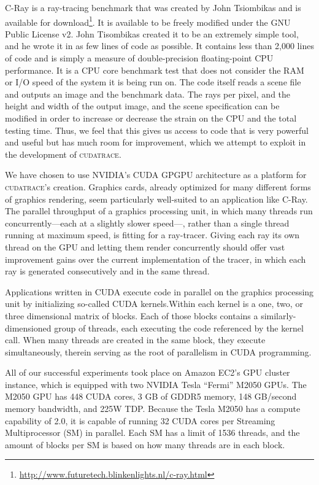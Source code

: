 \documentclass[12pt]{article}
\begin{document}
C-Ray is a ray-tracing benchmark that was created by John Tsiombikas and is available for download\footnote{\url{http://www.futuretech.blinkenlights.nl/c-ray.html}}. It is available to be freely modified under the GNU Public License v2. John Tisombikas created it to be an extremely simple tool, and he wrote it in as few lines of code as possible. It contains less than 2,000 lines of code and is simply a measure of double-precision floating-point CPU performance. It is a CPU core benchmark test that does not consider the RAM or I/O speed of the system it is being run on. The code itself reads a scene file and outputs an image and the benchmark data. The rays per pixel, and the height and width of the output image, and the scene specification can be modified in order to increase or decrease the strain on the CPU and the total testing time. Thus, we feel that this gives us access to code that is very powerful and useful but has much room for improvement, which we attempt to exploit in the development of \textsc{cudatrace}.

We have chosen to use NVIDIA's CUDA GPGPU architecture as a platform for \textsc{cudatrace}'s creation. Graphics cards, already optimized for many different forms of graphics rendering, seem particularly well-suited to an application like C-Ray. The parallel throughput of a graphics processing unit, in which many threads run concurrently---each at a slightly slower speed---, rather than a single thread running at maximum speed, is fitting for a ray-tracer. Giving each ray its own thread on the GPU and letting them render concurrently should offer vast improvement gains over the current implementation of the tracer, in which each ray is generated consecutively and in the same thread.

Applications written in CUDA execute code in parallel on the graphics processing unit by initializing so-called CUDA kernels.Within each kernel is a one, two, or three dimensional matrix of blocks. Each of those blocks contains a similarly-dimensioned group of threads, each executing the code referenced by the kernel call. When many threads are created in the same block, they execute simultaneously, therein serving as the root of parallelism in CUDA programming.

All of our successful experiments took place on Amazon EC2's GPU cluster instance, which is equipped with two NVIDIA Tesla “Fermi” M2050 GPUs. The M2050 GPU has 448 CUDA cores, 3 GB of GDDR5 memory, 148 GB/second memory bandwidth, and 225W TDP. Because the Tesla M2050 has a compute capability of 2.0, it is capable of running 32  CUDA cores per Streaming Multiprocessor (SM) in parallel. Each SM has a limit of 1536 threads, and the amount of blocks per SM is based on how many threads are in each block.
\end{document}

